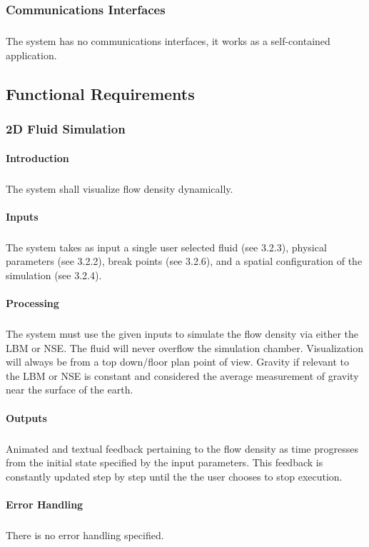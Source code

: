 \documentclass{scrartcl}
\begin{document}
\subsubsection{Communications Interfaces}
\subparagraph{}
The system has no communications interfaces, it works as a self-contained application.

\subsection{Functional Requirements}
\subsubsection{2D Fluid Simulation}
\paragraph{Introduction}
\subparagraph{}
The system shall visualize flow density dynamically.

\paragraph{Inputs}
\subparagraph{}
The system takes as input a single user selected fluid (see 3.2.3), physical parameters (see 3.2.2), break points (see 3.2.6), and a spatial configuration of the simulation (see 3.2.4). 

\paragraph{Processing}
\subparagraph{}
The system must use the given inputs to simulate the flow density via either the LBM or NSE. The fluid will never overflow the simulation chamber.  Visualization will always be from a top down/floor plan point of view. Gravity if relevant to the LBM or NSE is constant and considered the average measurement of gravity near the surface of the earth. 

\paragraph{Outputs}
\subparagraph{}
Animated and textual feedback pertaining to the flow density as time progresses from the initial state specified by the input parameters. This feedback is constantly updated step by step until the the user chooses to stop execution.

\paragraph{Error Handling}
\subparagraph{}
There is no error handling specified.
\end{document}
